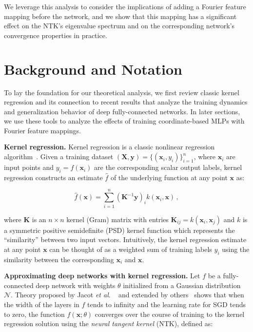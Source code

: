 We leverage this analysis to consider the implications of adding a Fourier feature mapping before the network, and we show that this mapping has a significant effect on the NTK's eigenvalue spectrum and on the corresponding network's convergence properties in practice. 

\section{Background and Notation}
\label{sec:bg}

To lay the foundation for our theoretical analysis, we first review classic kernel regression and its connection to recent results that analyze the training dynamics and generalization behavior of deep fully-connected networks. In later sections, we use these tools to analyze the effects of training coordinate-based MLPs with Fourier feature mappings. 

{\bf Kernel regression.} Kernel regression is a classic nonlinear regression algorithm~\cite{wainwright_2019}. Given a training dataset $(\mathbf{X}, \mathbf{y}) = \{(\mathbf{x}_i, y_i)\}_{i=1}^n$, where $\mathbf{x}_i$ are input points and $y_i=f(\mathbf{x}_i)$ are the corresponding scalar output labels, kernel regression constructs an estimate $\hat f$ of the underlying function at any point $\mathbf{x}$ as:

\begin{equation}
\label{eqn:kernel}
\hat f(\mathbf{x}) = \sum_{i=1}^n \left( \mathbf{K}^{-1} \mathbf y \right)_i k(\mathbf{x}_i, \mathbf{x})\,,
\end{equation}

where $\mathbf{K}$ is an $n\times n$ kernel (Gram) matrix with entries $\mathbf{K}_{ij} = k(\mathbf{x}_i, \mathbf{x}_j)$ and $k$ is a symmetric positive semidefinite (PSD) kernel function which represents the ``similarity'' between two input vectors. Intuitively, the kernel regression estimate at any point $\mathbf{x}$ can be thought of as a weighted sum of training labels $y_i$ using the similarity between the corresponding $\mathbf{x}_i$ and $\mathbf{x}$.

{\bf Approximating deep networks with kernel regression.} Let $f$ be a fully-connected deep network with weights $\theta$ initialized from a Gaussian distribution $\mathcal N$. Theory proposed by Jacot \textit{et al}. ~\cite{jacot2018neural} and extended by others~\cite{arora2019finegrained,basri2020frequency,lee2019wide} shows that when the width of the layers in $f$ tends to infinity and the learning rate for SGD tends to zero, the function $f(\mathbf x; \theta)$ converges over the course of training to the kernel regression solution using the \emph{neural tangent kernel} (NTK), defined as:

